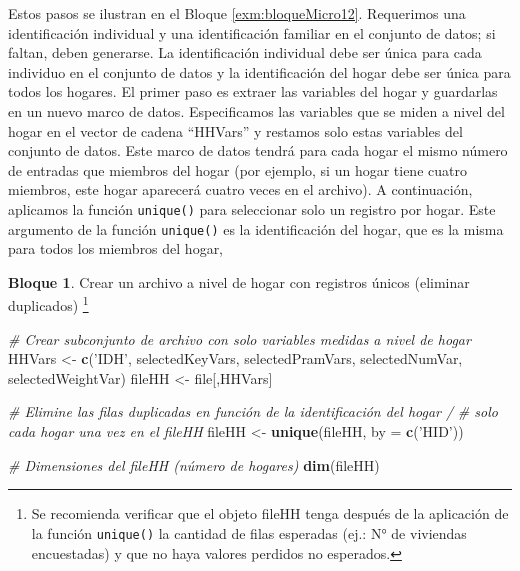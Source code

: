 \documentclass[]{book}
\newenvironment{Shaded}{\begin{snugshade}}{\end{snugshade}}
\newcommand{\CommentTok}[1]{\textcolor[rgb]{0.56,0.35,0.01}{\textit{#1}}}
\newcommand{\DataTypeTok}[1]{\textcolor[rgb]{0.13,0.29,0.53}{#1}}
\newcommand{\KeywordTok}[1]{\textcolor[rgb]{0.13,0.29,0.53}{\textbf{#1}}}
\newcommand{\NormalTok}[1]{#1}
\newcommand{\StringTok}[1]{\textcolor[rgb]{0.31,0.60,0.02}{#1}}
\theoremstyle{definition}
\theoremstyle{definition}
\newtheorem{example}{Bloque}[chapter]
\theoremstyle{definition}
\theoremstyle{definition}
\theoremstyle{remark}
\begin{document}
Estos pasos se ilustran en el Bloque \ref{exm:bloqueMicro12}. Requerimos una identificación individual y una identificación familiar en el conjunto de datos; si faltan, deben generarse. La identificación individual debe ser única para cada individuo en el conjunto de datos y la identificación del hogar debe ser única para todos los hogares. El primer paso es extraer las variables del hogar y guardarlas en un nuevo marco de datos. Especificamos las variables que se miden a nivel del hogar en el vector de cadena ``HHVars'' y restamos solo estas variables del conjunto de datos. Este marco de datos tendrá para cada hogar el mismo número de entradas que miembros del hogar (por ejemplo, si un hogar tiene cuatro miembros, este hogar aparecerá cuatro veces en el archivo). A continuación, aplicamos la función \texttt{unique()} para seleccionar solo un registro por hogar. Este argumento de la función \texttt{unique()} es la identificación del hogar, que es la misma para todos los miembros del hogar,

\begin{example}
\protect\hypertarget{exm:bloqueMicro12}{}{\label{exm:bloqueMicro12} }Crear un archivo a nivel de hogar con registros únicos (eliminar duplicados) \footnote{Se recomienda verificar que el objeto fileHH tenga después de la aplicación de la función \texttt{unique()} la cantidad de filas esperadas (ej.: N° de viviendas encuestadas) y que no haya valores perdidos no esperados.}
\end{example}

\begin{Shaded}
\begin{Highlighting}[]
\CommentTok{# Crear subconjunto de archivo con solo variables medidas a nivel de hogar}
\NormalTok{HHVars <-}\StringTok{ }\KeywordTok{c}\NormalTok{(}\StringTok{'IDH'}\NormalTok{, selectedKeyVars, selectedPramVars, selectedNumVar, selectedWeightVar)}
\NormalTok{fileHH <-}\StringTok{ }\NormalTok{file[,HHVars]}

\CommentTok{# Elimine las filas duplicadas en función de la identificación del hogar / }
\CommentTok{# solo cada hogar una vez en el fileHH}
\NormalTok{fileHH <-}\StringTok{ }\KeywordTok{unique}\NormalTok{(fileHH, }\DataTypeTok{by =} \KeywordTok{c}\NormalTok{(}\StringTok{'HID'}\NormalTok{))}

\CommentTok{# Dimensiones del fileHH (número de hogares)}
\KeywordTok{dim}\NormalTok{(fileHH)}
\end{Highlighting}
\end{Shaded}
\end{document}
